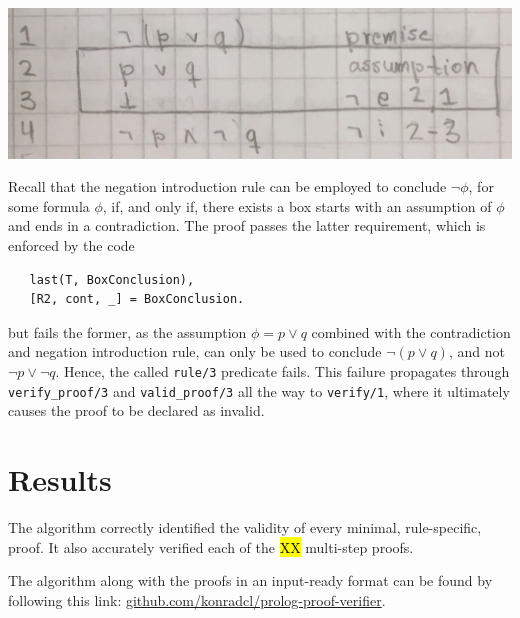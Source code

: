 \documentclass[a4paper, 11pt]{article}
\begin{document}
   \includegraphics[scale=0.25]{de-morgan-invalid}
   
   Recall that the negation introduction rule can be employed
   to conclude $\neg \phi$, for some formula $\phi$, if, and 
   only if, there exists a box starts with an assumption of
   $\phi$ and ends in a contradiction. The proof passes the
   latter requirement, which is enforced by the code

\begin{verbatim}
   last(T, BoxConclusion),
   [R2, cont, _] = BoxConclusion.
\end{verbatim}

   but fails the former, as the assumption $\phi = p \vee q$
   combined with the contradiction and negation introduction 
   rule, can only be used to conclude $\neg (p \vee q)$, and
   not $\neg p \vee \neg q$. Hence, the called
   \texttt{rule/3} predicate fails. This failure propagates
   through \texttt{verify\_proof/3} and 
   \texttt{valid\_proof/3} all the way to \texttt{verify/1},
   where it ultimately causes the proof to be declared as
   invalid.

   \section{Results}
   The algorithm correctly identified the validity of every
   minimal, rule-specific, proof. It also accurately verified
   each of the \hl{XX} multi-step proofs.
   \bigbreak

   The algorithm along with the proofs in an input-ready
   format can be found by following this link: 
   \url{github.com/konradcl/prolog-proof-verifier}.
\end{document}

